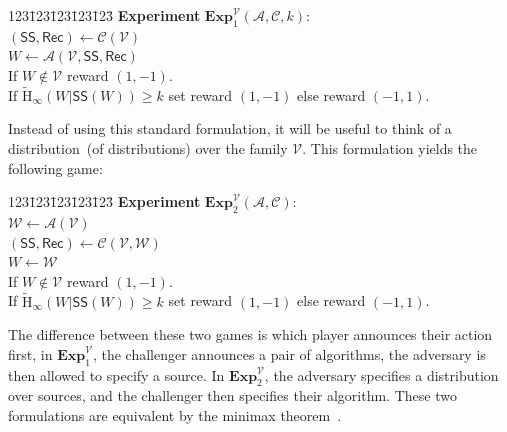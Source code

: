 \documentclass[11pt]{article}
\newcommand{\class}[1]{{\ensuremath{\mathsf{#1}}}}
\newcommand{\sketch}{\ensuremath{\class{SS}}\xspace}
\newcommand{\rec}{\ensuremath{\class{Rec}}\xspace}
\newcommand{\Hav}{\tilde{\mathrm{H}}_\infty}
\newcommand{\Exp}{\mathbf{Exp}}
\begin{document}
\begin{center}
\begin{minipage}{1in}
\begin{tabbing}
123\=123\=123\=123\=123\=\kill
\textbf{Experiment} $\Exp^{\mathcal{V}}_1(\mathcal{A}, \mathcal{C}, k)$: \\
$(\sketch, \rec)\leftarrow \mathcal{C}(\mathcal{V})$\\
$W \leftarrow \mathcal{A}(\mathcal{V}, \sketch, \rec)$\\
If $W\not\in \mathcal{V}$ reward $(1, -1)$.\\
If $\Hav(W | \sketch(W))\ge k$ set reward $(1, -1)$ else reward $(-1, 1)$.
\end{tabbing} \end{minipage} 
\end{center}

Instead of using this standard formulation, it will be useful to think of a distribution~(of distributions) over the family $\mathcal{V}$.  This formulation yields the following game:

\begin{center}
\begin{minipage}{1in}
\begin{tabbing}
123\=123\=123\=123\=123\=\kill
\textbf{Experiment} $\Exp^{\mathcal{V}}_2(\mathcal{A}, \mathcal{C})$: \\
$\mathcal{W} \leftarrow \mathcal{A}(\mathcal{V})$\\
$(\sketch, \rec)\leftarrow \mathcal{C}(\mathcal{V}, \mathcal{W})$\\
$W \leftarrow \mathcal{W}$\\
If $W\not\in \mathcal{V}$ reward $(1, -1)$.\\
If $\Hav(W | \sketch(W))\ge k$ set reward $(1, -1)$ else reward $(-1, 1)$.
\end{tabbing} \end{minipage} 
\end{center}

The difference between these two games is which player announces their action first, in $\Exp^{\mathcal{V}}_1$, the challenger announces a pair of algorithms, the adversary is then allowed to specify a source.  In $\Exp^{\mathcal{V}}_2$, the adversary specifies a distribution over sources, and the challenger then specifies their algorithm.  These two formulations are equivalent by the minimax theorem~\cite{neumann1928theorie}.
\end{document}
